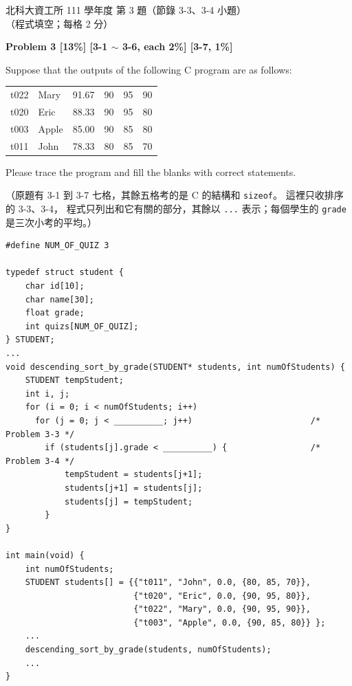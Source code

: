\begin{pastexam}[label={px:ntut-111-prog-02}]{北科大資工所 111 學年度 第 3 題（節錄 3-3、3-4 小題）}
（程式填空；每格 2 分）

\textbf{Problem 3 [13\%] [3-1 $\sim$ 3-6, each 2\%] [3-7, 1\%]}

Suppose that the outputs of the following C program are as follows:
\begin{center}
\begin{tabular}{llllll}
t022 & Mary & 91.67 & 90 & 95 & 90\\
t020 & Eric & 88.33 & 90 & 95 & 80\\
t003 & Apple & 85.00 & 90 & 85 & 80\\
t011 & John & 78.33 & 80 & 85 & 70
\end{tabular}
\end{center}
Please trace the program and fill the blanks with correct statements.

（原題有 3-1 到 3-7 七格，其餘五格考的是 C 的結構和 \texttt{sizeof}。 這裡只收排序的 3-3、3-4，
程式只列出和它有關的部分，其餘以 \texttt{...} 表示；每個學生的 \texttt{grade} 是三次小考的平均。）
\begin{verbatim}
#define NUM_OF_QUIZ 3

typedef struct student {
    char id[10];
    char name[30];
    float grade;
    int quizs[NUM_OF_QUIZ];
} STUDENT;
...
void descending_sort_by_grade(STUDENT* students, int numOfStudents) {
    STUDENT tempStudent;
    int i, j;
    for (i = 0; i < numOfStudents; i++)
      for (j = 0; j < __________; j++)                        /* Problem 3-3 */
        if (students[j].grade < __________) {                 /* Problem 3-4 */
            tempStudent = students[j+1];
            students[j+1] = students[j];
            students[j] = tempStudent;
        }
}

int main(void) {
    int numOfStudents;
    STUDENT students[] = {{"t011", "John", 0.0, {80, 85, 70}},
                          {"t020", "Eric", 0.0, {90, 95, 80}},
                          {"t022", "Mary", 0.0, {90, 95, 90}},
                          {"t003", "Apple", 0.0, {90, 85, 80}} };
    ...
    descending_sort_by_grade(students, numOfStudents);
    ...
}
\end{verbatim}
\end{pastexam}

